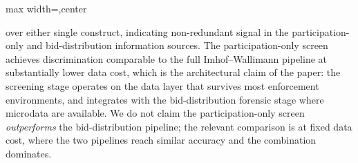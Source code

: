 \begin{table}[htbp]
\begin{adjustbox}{max width=\textwidth,center}
\begin{threeparttable}
\begin{tablenotes}
over either single construct, indicating non-redundant signal in the
participation-only and bid-distribution information sources. The
participation-only screen achieves discrimination comparable to the
full Imhof--Wallimann pipeline at substantially lower data cost,
which is the architectural claim of the paper: the screening
stage operates on the data layer that survives most enforcement
environments, and integrates with the bid-distribution forensic
stage where microdata are available. We do not claim the
participation-only screen \emph{outperforms} the bid-distribution
pipeline; the relevant comparison is at fixed data cost, where the
two pipelines reach similar accuracy and the combination dominates.
\end{tablenotes}
\end{threeparttable}
\end{adjustbox}
\end{table}
